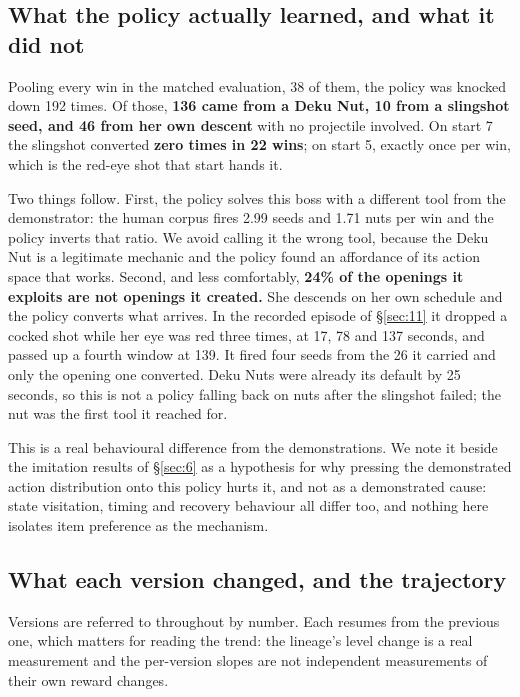\documentclass[11pt]{article}
\begin{document}
\subsection{What the policy actually learned, and what it did not}
\label{sec:5.2}

Pooling every win in the matched evaluation, 38 of them, the policy was knocked down 192 times. Of those, \textbf{136 came from a Deku Nut, 10 from a slingshot seed, and 46 from her own descent} with no projectile involved. On start 7 the slingshot converted \textbf{zero times in 22 wins}; on start 5, exactly once per win, which is the red-eye shot that start hands it.

Two things follow. First, the policy solves this boss with a different tool from the demonstrator: the human corpus fires 2.99 seeds and 1.71 nuts per win and the policy inverts that ratio. We avoid calling it the wrong tool, because the Deku Nut is a legitimate mechanic and the policy found an affordance of its action space that works. Second, and less comfortably, \textbf{24\% of the openings it exploits are not openings it created.} She descends on her own schedule and the policy converts what arrives. In the recorded episode of \S\ref{sec:11} it dropped a cocked shot while her eye was red three times, at 17, 78 and 137 seconds, and passed up a fourth window at 139. It fired four seeds from the 26 it carried and only the opening one converted. Deku Nuts were already its default by 25 seconds, so this is not a policy falling back on nuts after the slingshot failed; the nut was the first tool it reached for.

This is a real behavioural difference from the demonstrations. We note it beside the imitation results of \S\ref{sec:6} as a hypothesis for why pressing the demonstrated action distribution onto this policy hurts it, and not as a demonstrated cause: state visitation, timing and recovery behaviour all differ too, and nothing here isolates item preference as the mechanism.

\subsection{What each version changed, and the trajectory}
\label{sec:5.3}

Versions are referred to throughout by number. Each resumes from the previous one, which matters for reading the trend: the lineage's level change is a real measurement and the per-version slopes are not independent measurements of their own reward changes.
\end{document}
